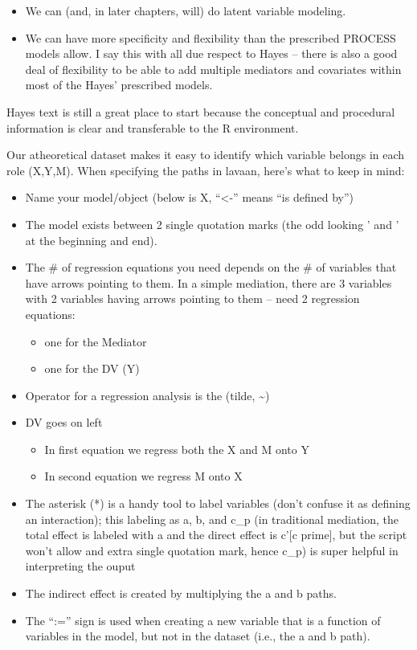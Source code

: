 \documentclass[
  11pt,
]{book}
\providecommand{\tightlist}{%
  \setlength{\itemsep}{0pt}\setlength{\parskip}{0pt}}
\begin{document}
\begin{itemize}
\tightlist
\item
  We can (and, in later chapters, will) do latent variable modeling.
\item
  We can have more specificity and flexibility than the prescribed PROCESS models allow. I say this with all due respect to Hayes -- there is also a good deal of flexibility to be able to add multiple mediators and covariates within most of the Hayes' prescribed models.
\end{itemize}

Hayes text is still a great place to start because the conceptual and procedural information is clear and transferable to the R environment.

Our atheoretical dataset makes it easy to identify which variable belongs in each role (X,Y,M). When specifying the paths in lavaan, here's what to keep in mind:

\begin{itemize}
\tightlist
\item
  Name your model/object (below is X, ``\textless-'' means ``is defined by'')
\item
  The model exists between 2 single quotation marks (the odd looking ' and ' at the beginning and end).
\item
  The \# of regression equations you need depends on the \# of variables that have arrows pointing to them. In a simple mediation, there are 3 variables with 2 variables having arrows pointing to them -- need 2 regression equations:

  \begin{itemize}
  \tightlist
  \item
    one for the Mediator
  \item
    one for the DV (Y)
  \end{itemize}
\item
  Operator for a regression analysis is the (tilde, \textasciitilde)
\item
  DV goes on left

  \begin{itemize}
  \tightlist
  \item
    In first equation we regress both the X and M onto Y
  \item
    In second equation we regress M onto X
  \end{itemize}
\item
  The asterisk (*) is a handy tool to label variables (don't confuse it as defining an interaction); this labeling as a, b, and c\_p (in traditional mediation, the total effect is labeled with a and the direct effect is c'{[}c prime{]}, but the script won't allow and extra single quotation mark, hence c\_p) is super helpful in interpreting the ouput
\item
  The indirect effect is created by multiplying the a and b paths.\\
\item
  The ``:='' sign is used when creating a new variable that is a function of variables in the model, but not in the dataset (i.e., the a and b path).
\end{itemize}
\end{document}
